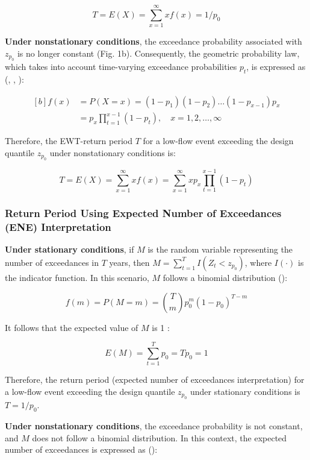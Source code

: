 \documentclass[
]{krantz}
\begin{document}
\[
T=E(X)=\sum_{x=1}^{\infty} x f(x)=1 / p_{0} \tag{7}
\]

\textbf{Under nonstationary conditions}, the exceedance probability associated with \(z_{p_{0}}\) is no longer constant (Fig. 1b). Consequently, the geometric probability law, which takes into account time-varying exceedance probabilities \(p_{t}\), is expressed as (\citet{Cooley2013}, \citet{Salas2013}, \citet{Salas2014}):

\[
\begin{aligned}[b]
f(x) & =P(X=x)=\left(1-p_{1}\right)\left(1-p_{2}\right) \ldots\left(1-p_{x-1}\right) p_{x} \\
& =p_{x} \prod_{t=1}^{x-1}\left(1-p_{t}\right), \quad x=1,2, \ldots, \infty 
\end{aligned}\tag{8}
\]

Therefore, the EWT-return period \(T\) for a low-flow event exceeding the design quantile \(z_{p_{0}}\) under nonstationary conditions is:

\[
 T=E(X)=\sum_{x=1}^{\infty} x f(x)=\sum_{x=1}^{\infty} x p_{x} \prod_{t=1}^{x-1}\left(1-p_{t}\right) \tag{9}
\]

\subsubsection{Return Period Using Expected Number of Exceedances (ENE) Interpretation}\label{return-period-using-expected-number-of-exceedances-ene-interpretation}

\textbf{Under stationary conditions}, if \(M\) is the random variable representing the number of exceedances in \(T\) years, then \(M=\sum_{t=1}^{T} I\left(Z_{t}<z_{p_{0}}\right)\), where \(I(\cdot)\) is the indicator function. In this scenario, \(M\) follows a binomial distribution (\citet{Cooley2013}):

\[
f(m)=P(M=m)=\binom{T}{m} p_{0}^{m}\left(1-p_{0}\right)^{T-m} \tag{10}
\]

It follows that the expected value of \(M\) is 1 :

\[
E(M)=\sum_{t=1}^{T} p_{0}=T p_{0}=1 \tag{11}
\]

Therefore, the return period (expected number of exceedances interpretation) for a low-flow event exceeding the design quantile \(z_{p_{0}}\) under stationary conditions is \(T=1 / p_{0}\).

\textbf{Under nonstationary conditions}, the exceedance probability is not constant, and \(M\) does not follow a binomial distribution. In this context, the expected number of exceedances is expressed as (\citet{Cooley2013}):
\end{document}
